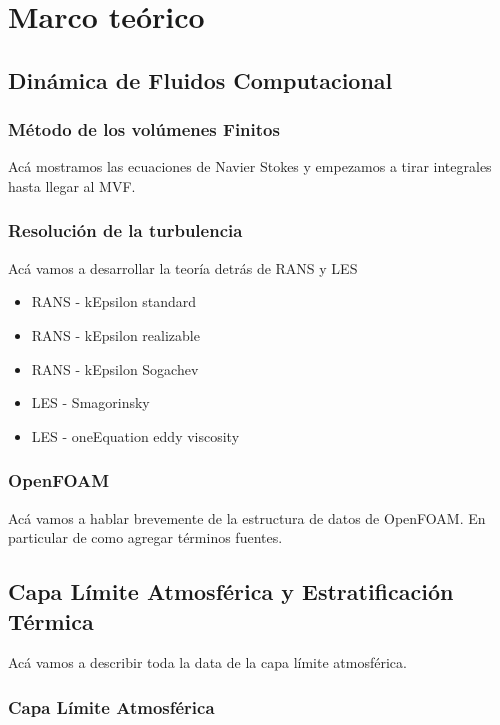 \chapter{Marco teórico}

\section{Dinámica de Fluidos Computacional}

\subsection{Método de los volúmenes Finitos}

Acá mostramos las ecuaciones de Navier Stokes y empezamos a tirar integrales hasta llegar al MVF.

\subsection{Resolución de la turbulencia}

Acá vamos a desarrollar la teoría detrás de RANS y LES

\begin{itemize}
	\item RANS - kEpsilon standard
	\item RANS - kEpsilon realizable
	\item RANS - kEpsilon Sogachev
	\item LES - Smagorinsky
	\item LES -  oneEquation eddy viscosity
\end{itemize}

\subsection{OpenFOAM}

Acá vamos a hablar brevemente de la estructura de datos de OpenFOAM. En particular de como agregar términos fuentes.

\section{Capa Límite Atmosférica y Estratificación Térmica}

Acá vamos a describir toda la data de la capa límite atmosférica. 

\subsection{Capa Límite Atmosférica}

